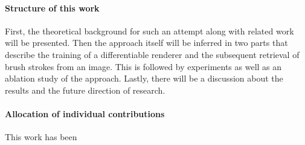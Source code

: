 %
%
%


\paragraph{Structure of this work}
First, the theoretical background for such an attempt along with related work will be presented.
Then the approach itself will be inferred in two parts that describe the training of a differentiable renderer
and the subsequent retrieval of brush strokes from an image.
This is followed by experiments as well as an ablation study of the approach.
Lastly, there will be a discussion about the results and the future direction of research.



\paragraph{Allocation of individual contributions}
This work has been 
